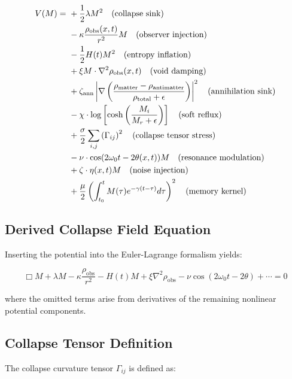 \begin{align}
V(M) =\ 
& + \frac{1}{2} \lambda M^2 \quad \text{(collapse sink)} \notag \\
& - \kappa \frac{\rho_{\text{obs}}(x,t)}{r^2} M \quad \text{(observer injection)} \notag \\
& - \frac{1}{2} H(t) M^2 \quad \text{(entropy inflation)} \notag \\
& + \xi M \cdot \nabla^2 \rho_{\text{obs}}(x,t) \quad \text{(void damping)} \notag \\
& + \zeta_{\text{ann}} \left| \nabla \left( \frac{\rho_{\text{matter}} - \rho_{\text{antimatter}}}{\rho_{\text{total}} + \epsilon} \right) \right|^2 \quad \text{(annihilation sink)} \notag \\
& - \chi \cdot \log\left[ \cosh\left( \frac{M_i}{M_r + \epsilon} \right) \right] \quad \text{(soft reflux)} \notag \\
& + \frac{\sigma}{2} \sum_{i,j} \left( \Gamma_{ij} \right)^2 \quad \text{(collapse tensor stress)} \notag \\
& - \nu \cdot \cos(2\omega_0 t - 2\theta(x,t)) M \quad \text{(resonance modulation)} \notag \\
& + \zeta \cdot \eta(x,t) M \quad \text{(noise injection)} \notag \\
& + \frac{\mu}{2} \left( \int_{t_0}^t M(\tau) e^{-\gamma(t - \tau)} d\tau \right)^2 \quad \text{(memory kernel)}
\end{align}

\subsection{Derived Collapse Field Equation}

Inserting the potential into the Euler-Lagrange formalism yields:

\begin{equation}
\boxed{
\Box M 
+ \lambda M 
- \kappa \frac{\rho_{\text{obs}}}{r^2}
- H(t) M 
+ \xi \nabla^2 \rho_{\text{obs}}
- \nu \cos(2\omega_0 t - 2\theta) 
+ \cdots = 0
}
\end{equation}

where the omitted terms arise from derivatives of the remaining nonlinear potential components.

\subsection{Collapse Tensor Definition}

The collapse curvature tensor \( \Gamma_{ij} \) is defined as:

